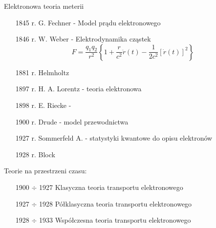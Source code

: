 Elektronowa teoria meterii 
\begin{itemize}
	\item[1845 r.] G. Fechner - Model prądu elektronowego 
	\item[1846 r.] W. Weber - Elektrodynamika cząstek
		$$ F = \dfrac{q_1q_2}{r^2} \left\{ 1 + \dfrac{r}{c^2} \ddot{r} (t) -
		\dfrac{1}{2c^2} \left[ \dot{r} (t) \right]^2 \right\} $$
	\item[1881 r.] Helmholtz
	\item[1897 r.] H. A. Lorentz - teoria elektronowa
	\item[1898 r.] E. Riecke - 
	\item[1900 r.] Drude - model przewodnictwa
	\item[1927 r.] Sommerfeld A. - statystyki kwantowe do opisu elektronów
	\item[1928 r.] Block
\end{itemize}
Teorie na przestrzeni czasu:
\begin{itemize}
	\item[1900 $\div$ 1927] Klasyczna teoria transportu elektronowego 
	\item[1927 $\div$ 1928] Półklasyczna teoria transportu elektronowego
	\item[1928 $\div$ 1933] Współczesna teoria transportu elektronowego 
\end{itemize}

